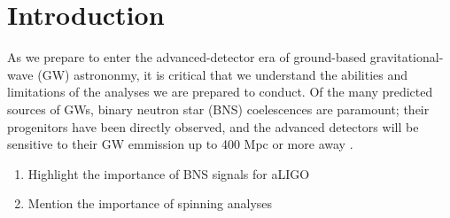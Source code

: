 \section{Introduction}

As we prepare to enter the advanced-detector era of ground-based gravitational-wave (GW) astrononmy, it is critical that we understand the abilities and limitations of the analyses we are prepared to conduct.  Of the many predicted sources of GWs, binary neutron star (BNS) coelescences are paramount; their progenitors have been directly observed, and the advanced detectors will be sensitive to their GW emmission up to 400 Mpc or more away \cite{2013arXiv1304.0670L}.


\begin{enumerate}
\item Highlight the importance of BNS signals for aLIGO
\item Mention the importance of spinning analyses
\end{enumerate}